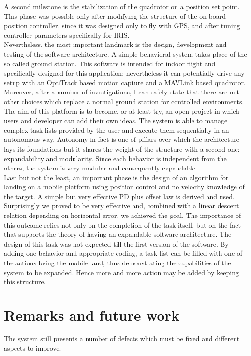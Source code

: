 A second milestone is the stabilization of the quadrotor on a position set point. This phase was possible only after modifying the structure of the on board position controller, since it was designed only to fly with GPS, and after tuning controller parameters specifically for IRIS. \\

\noindent
Nevertheless, the most important landmark is the design, development and testing of the software architecture. A simple behavioral system takes place of the so called ground station. This software is intended for indoor flight and specifically designed for this application; nevertheless it can potentially drive any setup with an OptiTrack based motion capture and a MAVLink based quadrotor. Moreover, after a number of investigations, I can safely state that there are not other choices which replace a normal ground station for controlled environments. The aim of this platform is to become, or at least try, an open project in which users and developer can add their own ideas. The system is able to manage complex task lists provided by the user and execute them sequentially in an autonomous way. Autonomy in fact is one of pillars over which the architecture lays its foundations but it shares the weight of the structure with a second one: expandability and modularity. Since each behavior is independent from the others, the system is very modular and consequently expandable. \\

\noindent
Last but not the least, an important phase is the design of an algorithm for landing on a mobile platform using position control and no velocity knowledge of the target. A simple but very effective PD plus offset law is derived and used. Surprisingly we proved to be very effective and, combined with a linear descent relation depending on horizontal error, we achieved the goal. The importance of this outcome relies not only on the completion of the task itself, but on the fact that supports the theory of having an expandable software architecture. The design of this task was not expected till the first version of the software. By adding one behavior and appropriate coding, a task list can be filled with one of the actions being the mobile land, thus demonstrating the capabilities of the system to be expanded. Hence more and more action may be added by keeping this structure.

\section*{Remarks and future work}
The system still presents a number of defects which must be fixed and different aspects to improve. \\

